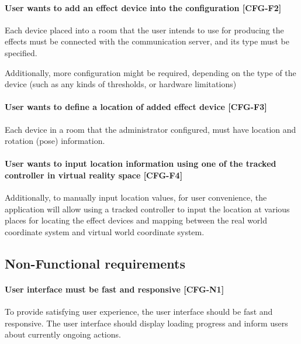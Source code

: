\hypertarget{x-\textbf{user-wants-to-add-an-effect-device-into-the-configuration}-[cfg-f2]}{\paragraph*{\textbf{User wants to add an effect device into the configuration} [CFG-F2]}}
Each device placed into a room that the user intends to use for producing the effects
must be connected with the communication server, and its type must be specified.


Additionally, more configuration might be required, depending on the type
of the device (such as any kinds of thresholds, or hardware limitations)


\hypertarget{x-\textbf{user-wants-to-define-a-location-of-added-effect-device}-[cfg-f3]}{\paragraph*{\textbf{User wants to define a location of added effect device} [CFG-F3]}}
Each device in a room that the administrator configured,
must have location and rotation (pose) information.


\hypertarget{x-\textbf{user-wants-to-input-location-information-using-one-of-the-tracked-controller-in-virtual-reality-space}-[cfg-f4]}{\paragraph*{\textbf{User wants to input location information using one of the tracked controller in virtual reality space} [CFG-F4]}}
Additionally, to manually input location values, for user convenience,
the application will allow using a tracked controller to input the location at
various places for locating the effect
devices and mapping between the real world coordinate system and virtual
world coordinate system.


\hypertarget{x-non-functional-requirements}{\subsection{Non-Functional requirements}}
\hypertarget{x-\textbf{user-interface-must-be-fast-and-responsive}-[cfg-n1]}{\paragraph*{\textbf{User interface must be fast and responsive} [CFG-N1]}}
To provide satisfying user experience, the user interface should be fast and
responsive. The user interface should display loading progress and inform users
about currently ongoing actions.


